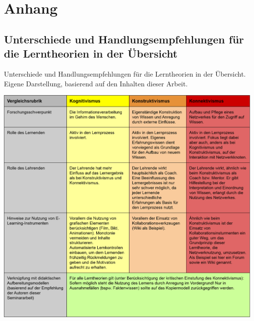 \chapter{Anhang}
\newpage
\section{Unterschiede und Handlungsempfehlungen für die Lerntheorien in der Übersicht}
\begin{table}[h]
	\caption{Unterschiede und Handlungsempfehlungen für die Lerntheorien in der Übersicht. Eigene Darstellung, basierend auf den Inhalten dieser Arbeit.}
	\vspace{1em}
	\centering
	\includegraphics[width=1.0\textwidth]{Abbildungen/Gegenuberstellung.png}
	
	\label{fig:Unterschiede und Handlungsempfehlungen für die Lerntheorien}
\end{table}